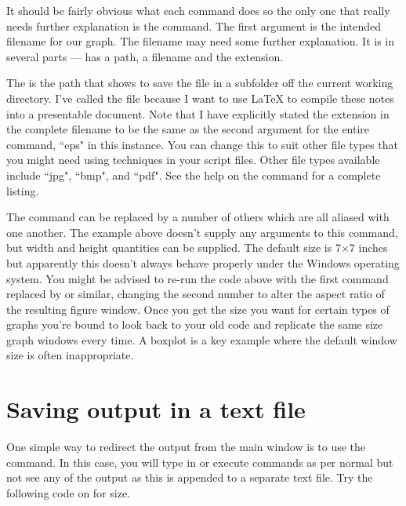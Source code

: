 
 
It should be fairly obvious what each command does so the only one that really needs further explanation is the  command. The first argument is the intended filename for our graph. The filename may need some further explanation. It is in several parts ---  has a path, a filename and the extension. 
 
The  is the path that shows \R{} to save the file in a subfolder off the current working directory. I've called the file  because I want to use \LaTeX{} to compile these notes into a presentable document. 
Note that I have explicitly stated the extension in the complete filename to be the same as the second argument for the entire command, ``eps" in this instance. You can change this to suit other file types that you might need using  techniques in your script files. Other file types available include ``jpg", ``bmp", and ``pdf". See the help on the  command for a complete listing. 
 
The  command can be replaced by a number of others which are all aliased with one another. The example above doesn't supply any arguments to this command, but width and height quantities can be supplied. The default size is 7$\times$7 inches but apparently this doesn't always behave properly under the Windows operating system. You might be advised to re-run the code above with the first command replaced by  or similar, changing the second number to alter the aspect ratio of the resulting figure window. Once you get the size you want for certain types of graphs you're bound to look back to your old code and replicate the same size graph windows every time. A boxplot is a key example where the default window size is often inappropriate. 
 
\section{Saving output in a text file}\label{TextSink} 
 
One simple way to redirect the output from the main \R{} window is to use the  command. In this case, you will type in or execute commands as per normal but not see any of the output as this is appended to a separate text file. Try the following code on for size. 
 
